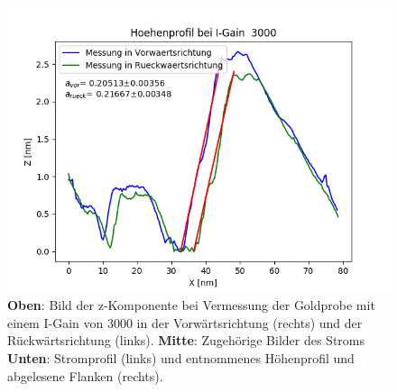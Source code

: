 \documentclass[12pt,a4paper]{article}
\begin{document}
\begin{figure}[H]
\includegraphics[scale=0.5]{Bilder/Anhang/IGain/Profil_IGain_3000.png}
\caption{\textbf{Oben}: Bild der z-Komponente bei Vermessung der Goldprobe mit einem I-Gain von 3000 in der Vorwärtsrichtung (rechts) und der Rückwärtsrichtung (links). \textbf{Mitte}: Zugehörige Bilder des Stroms \textbf{Unten}: Stromprofil (links) und entnommenes Höhenprofil und abgelesene Flanken (rechts).}
\end{figure}
\end{document}
